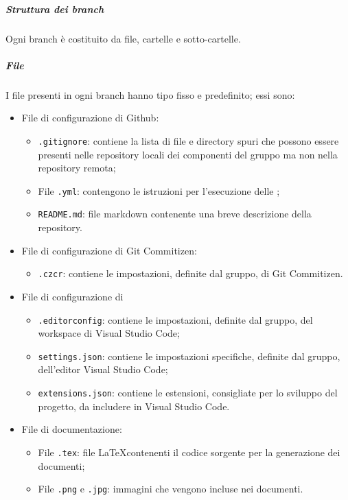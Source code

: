 \documentclass[../norme-di-progetto.tex]{subfiles}
\begin{document}
\subparagraph{Struttura dei branch}
Ogni branch è costituito da file, cartelle e sotto-cartelle.
\subparagraph*{File}
I file presenti in ogni branch hanno tipo fisso e predefinito; essi sono:
\begin{itemize}
  \item File di configurazione di Github:
  \begin{itemize}
    \item \texttt{.gitignore}: contiene la lista di file e directory spuri che possono essere presenti nelle repository locali dei componenti del gruppo ma non nella repository remota;
    \item File \texttt{.yml}: contengono le istruzioni per l'esecuzione delle ;
    \item \texttt{README.md}: file markdown contenente una breve descrizione della repository.
  \end{itemize}
  \item File di configurazione di Git Commitizen:
  \begin{itemize}
    \item \texttt{.czcr}: contiene le impostazioni, definite dal gruppo, di Git Commitizen.
  \end{itemize}
  \item File di configurazione di 
  \begin{itemize}
    \item \texttt{.editorconfig}: contiene le impostazioni, definite dal gruppo, del workspace di Visual Studio Code;
    \item \texttt{settings.json}: contiene le impostazioni specifiche, definite dal gruppo, dell'editor Visual Studio Code;
    \item \texttt{extensions.json}: contiene le estensioni, consigliate per lo sviluppo del progetto, da includere in Visual Studio Code.
  \end{itemize}
  \item File di documentazione:
  \begin{itemize}
    \item File \texttt{.tex}: file \LaTeX contenenti il codice sorgente per la generazione dei documenti;
    \item File \texttt{.png} e \texttt{.jpg}: immagini che vengono incluse nei documenti.
  \end{itemize}
\end{itemize}
\end{document}

